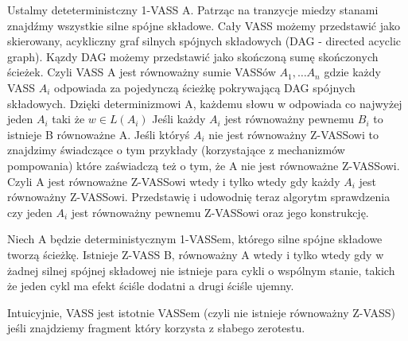     Ustalmy deteterministczny 1-VASS A.
    Patrząc na tranzycje miedzy stanami znajdźmy wszystkie silne spójne składowe.
    Cały VASS możemy przedstawić jako skierowany, acykliczny graf silnych spójnych składowych (DAG - directed acyclic graph).
    Kązdy DAG możemy przedstawić jako skończoną sumę skończonych ścieżek.
    Czyli VASS A jest równoważny sumie VASSów $A_1, \dots A_n$ gdzie każdy VASS $A_i$ odpowiada za pojedynczą ścieżkę pokrywającą DAG spójnych składowych.
    Dzięki determinizmowi A, każdemu słowu w odpowiada co najwyżej jeden $A_i$ taki że $w \in L(A_i)$
    Jeśli każdy $A_i$ jest równoważny pewnemu $B_i$ to istnieje B równoważne A.
    Jeśli któryś $A_i$ nie jest równoważny Z-VASSowi to znajdzimy świadczące o tym przykłady (korzystające z mechanizmów pompowania) które
    zaświadczą też o tym, że A nie jest równoważne Z-VASSowi.
    Czyli A jest równoważne Z-VASSowi wtedy i tylko wtedy gdy każdy $A_i$ jest równoważny Z-VASSowi.
    Przedstawię i udowodnię teraz algorytm sprawdzenia czy jeden $A_i$ jest równoważny pewnemu Z-VASSowi oraz jego konstrukcję.
    \begin{theorem}
        Niech A będzie deterministycznym 1-VASSem, którego silne spójne składowe tworzą ścieżkę.
        Istnieje Z-VASS B, równoważny A wtedy i tylko wtedy gdy w żadnej silnej spójnej składowej nie istnieje para cykli o wspólnym stanie,
        takich że jeden cykl ma efekt ściśle dodatni a drugi ściśle ujemny.
    \end{theorem}
    Intuicyjnie, VASS jest istotnie VASSem (czyli nie istnieje równoważny Z-VASS) jeśli znajdziemy fragment który korzysta z słabego zerotestu.
